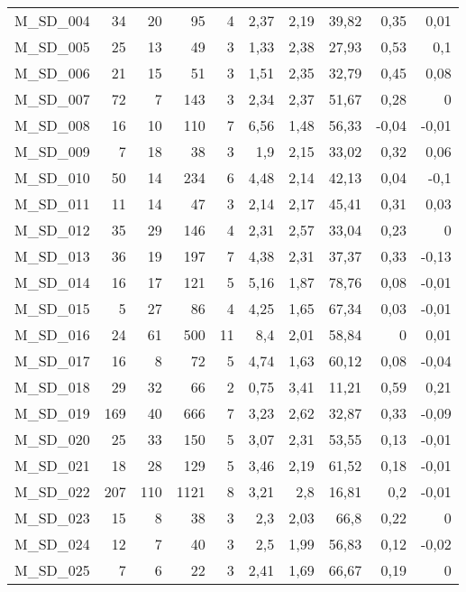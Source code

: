 \documentclass{article}
\begin{document}
\begin{table}[htbp]
\begin{tabular}{lrrrrrrrrr}
    M\_SD\_004 & 34   & 20   & 95   & 4    & 2,37 & 2,19 & 39,82 & 0,35 & 0,01 \\
    M\_SD\_005 & 25   & 13   & 49   & 3    & 1,33 & 2,38 & 27,93 & 0,53 & 0,1 \\
    M\_SD\_006 & 21   & 15   & 51   & 3    & 1,51 & 2,35 & 32,79 & 0,45 & 0,08 \\
    M\_SD\_007 & 72   & 7    & 143  & 3    & 2,34 & 2,37 & 51,67 & 0,28 & 0 \\
    M\_SD\_008 & 16   & 10   & 110  & 7    & 6,56 & 1,48 & 56,33 & -0,04 & -0,01 \\
    M\_SD\_009 & 7    & 18   & 38   & 3    & 1,9  & 2,15 & 33,02 & 0,32 & 0,06 \\
    M\_SD\_010 & 50   & 14   & 234  & 6    & 4,48 & 2,14 & 42,13 & 0,04 & -0,1 \\
    M\_SD\_011 & 11   & 14   & 47   & 3    & 2,14 & 2,17 & 45,41 & 0,31 & 0,03 \\
    M\_SD\_012 & 35   & 29   & 146  & 4    & 2,31 & 2,57 & 33,04 & 0,23 & 0 \\
    M\_SD\_013 & 36   & 19   & 197  & 7    & 4,38 & 2,31 & 37,37 & 0,33 & -0,13 \\
    M\_SD\_014 & 16   & 17   & 121  & 5    & 5,16 & 1,87 & 78,76 & 0,08 & -0,01 \\
    M\_SD\_015 & 5    & 27   & 86   & 4    & 4,25 & 1,65 & 67,34 & 0,03 & -0,01 \\
    M\_SD\_016 & 24   & 61   & 500  & 11   & 8,4  & 2,01 & 58,84 & 0    & 0,01 \\
    M\_SD\_017 & 16   & 8    & 72   & 5    & 4,74 & 1,63 & 60,12 & 0,08 & -0,04 \\
    M\_SD\_018 & 29   & 32   & 66   & 2    & 0,75 & 3,41 & 11,21 & 0,59 & 0,21 \\
    M\_SD\_019 & 169  & 40   & 666  & 7    & 3,23 & 2,62 & 32,87 & 0,33 & -0,09 \\
    M\_SD\_020 & 25   & 33   & 150  & 5    & 3,07 & 2,31 & 53,55 & 0,13 & -0,01 \\
    M\_SD\_021 & 18   & 28   & 129  & 5    & 3,46 & 2,19 & 61,52 & 0,18 & -0,01 \\
    M\_SD\_022 & 207  & 110  & 1121 & 8    & 3,21 & 2,8  & 16,81 & 0,2  & -0,01 \\
    M\_SD\_023 & 15   & 8    & 38   & 3    & 2,3  & 2,03 & 66,8 & 0,22 & 0 \\
    M\_SD\_024 & 12   & 7    & 40   & 3    & 2,5  & 1,99 & 56,83 & 0,12 & -0,02 \\
    M\_SD\_025 & 7    & 6    & 22   & 3    & 2,41 & 1,69 & 66,67 & 0,19 & 0 \\

\end{tabular}
\end{table}
\end{document}

